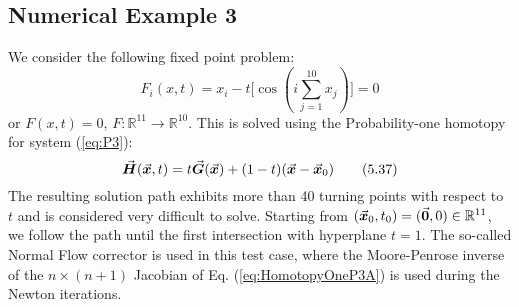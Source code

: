 \subsection{Numerical Example 3}
We consider the following fixed point 
problem\cite{Watson79,Georg81,Schwetlick87}:
\begin{equation}
	F_i(x,t) = x_i-t\bigl[\cos(i\sum_{j=1}^{10} x_j)\bigr]=0
	\tag{5.36}\label{eq:P3}
\end{equation}
or $F(x,t)=0$, $F:\mathbb{R}^{11}\rightarrow\mathbb{R}^{10}$. This is 
solved using the Probability-one
homotopy\cite{Chow78,Watson:1990} for system (\ref{eq:P3}):
\begin{equation}
	\vec{\bm{H}}(\vec{\bm{x}},t)=t \vec{\bm{G}}(\vec{\bm{x}})+(1-t)(\vec{\bm{x}}-\vec{\bm{x}}_0)
	\tag{5.37}\label{eq:HomotopyOneP3A}
\end{equation}
The resulting solution path exhibits more than 40 turning points with respect to
$t$ and is considered very difficult to solve. Starting from
$(\vec{\bm{x}}_0,t_0)=(\vec{\bm{0}},0)\in\mathbb{R}^{11}$, we follow the path until the
first intersection with hyperplane $t=1$. The so-called Normal Flow
corrector\cite{Watson86} is used in this test case, where the Moore-Penrose 
inverse of the
$n\times(n+1)$ Jacobian of Eq. (\ref{eq:HomotopyOneP3A}) is used during the 
Newton 
iterations.

